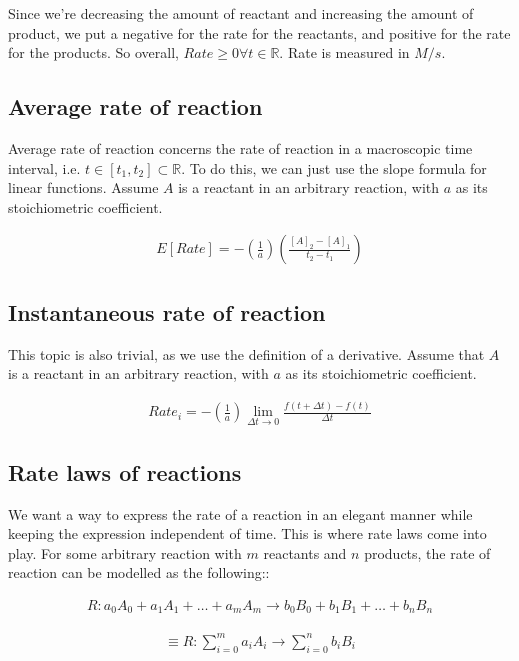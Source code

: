 \documentclass[12pt]{book}
\begin{document}
Since we're decreasing the amount of reactant and increasing the amount of product, we put a negative for the rate for the reactants, and positive for the rate for the products. So overall, $Rate\geq 0\forall t\in \mathbb{R}$. Rate is measured in $M/s$.

\subsection*{Average rate of reaction}

Average rate of reaction concerns the rate of reaction in a macroscopic time interval, i.e. $t\in[t_1,t_2]\subset \mathbb{R}$. To do this, we can just use the slope formula for linear functions. Assume $A$ is a reactant in an arbitrary reaction, with $a$ as its stoichiometric coefficient.

\begin{align*}
    E[Rate]=-\left(\frac{1}{a}\right)\left(\frac{[A]_2-[A]_1}{t_2-t_1}\right)
\end{align*}

\subsection*{Instantaneous rate of reaction}

This topic is also trivial, as we use the definition of a derivative. Assume that $A$ is a reactant in an arbitrary reaction, with $a$ as its stoichiometric coefficient.


\begin{align*}
    Rate_i=-\left(\frac{1}{a}\right)\lim_{\Delta t\rightarrow 0} \frac{f(t+\Delta t)-f(t)}{\Delta t}
\end{align*}

\subsection*{Rate laws of reactions}

We want a way to express the rate of a reaction in an elegant manner while keeping the expression independent of time. This is where rate laws come into play. For some arbitrary reaction with $m$ reactants and $n$ products, the rate of reaction can be modelled as the following::

\begin{align*}
    R: a_0A_0+a_1A_1+\ldots+a_mA_m\rightarrow b_0B_0+b_1B_1+\ldots+b_nB_n
\end{align*}

\begin{align*}
    \equiv R: \sum_{i=0}^{m}a_iA_i\rightarrow\sum_{i=0}^{n}b_iB_i
\end{align*}
\end{document}
